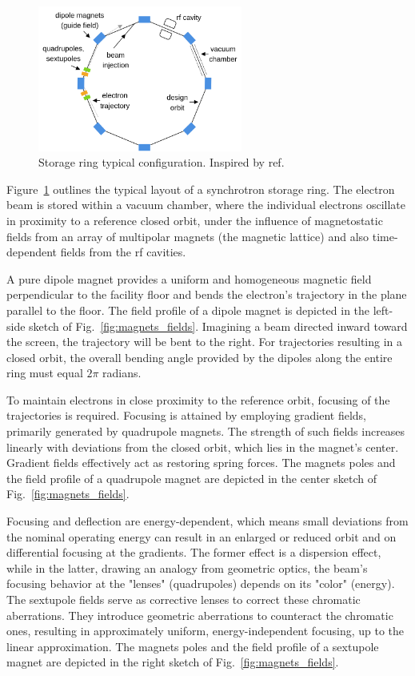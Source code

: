 \begin{figure}[tb]
    \centering
    \includegraphics[width=0.6\textwidth]{Images/storage_ring.png}
    \caption[Storage ring typical configuration.]{Storage ring typical configuration. Inspired by ref.~\cite{sands_physics_1969}}
    \label{fig:storage_ring}
\end{figure}
Figure~\ref{fig:storage_ring} outlines the typical layout of a synchrotron storage ring. The electron beam is stored within a vacuum chamber, where the individual electrons oscillate in proximity to a reference closed orbit, under the influence of magnetostatic fields from an array of multipolar magnets (the magnetic lattice) and also time-dependent fields from the \gls*{rf} cavities.

A pure dipole magnet provides a uniform and homogeneous magnetic field perpendicular to the facility floor and bends the electron's trajectory in the plane parallel to the floor. The field profile of a dipole magnet is depicted in the left-side sketch of Fig.~\ref{fig:magnets_fields}. Imagining a beam directed inward toward the screen, the trajectory will be bent to the right. For trajectories resulting in a closed orbit, the overall bending angle provided by the dipoles along the entire ring must equal $2\pi$ radians.

To maintain electrons in close proximity to the reference orbit, focusing of the trajectories is required. Focusing is attained by employing gradient fields, primarily generated by quadrupole magnets. The strength of such fields increases linearly with deviations from the closed orbit, which lies in the magnet's center. Gradient fields effectively act as restoring spring forces. The magnets poles and the field profile of a quadrupole magnet are depicted in the center sketch of Fig.~\ref{fig:magnets_fields}.

Focusing and deflection are energy-dependent, which means small deviations from the nominal operating energy can result in an enlarged or reduced orbit and on differential focusing at the gradients. The former effect is a dispersion effect, while in the latter, drawing an analogy from geometric optics, the beam's focusing behavior at the "lenses" (quadrupoles) depends on its "color" (energy). The sextupole fields serve as corrective lenses to correct these chromatic aberrations. They introduce geometric aberrations to counteract the chromatic ones, resulting in approximately uniform, energy-independent focusing, up to the linear approximation. The magnets poles and the field profile of a sextupole magnet are depicted in the right sketch of Fig.~\ref{fig:magnets_fields}.

